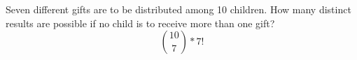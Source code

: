 \item Seven different gifts are to be distributed among 10 children. How many distinct results are possible if no child is to receive more than one gift?
\[ \binom{10}{7} * 7! \]